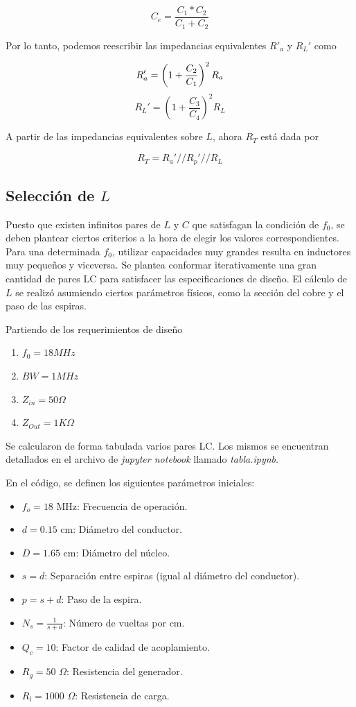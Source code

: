 $$
C_e = \frac{C_1*C_2}{C_1+C_2}
$$

Por lo tanto, podemos reescribir las impedancias equivalentes $R'_a$ y $R_L'$ como

$$
R_a' = \left( 1 + \frac{C_2}{C_1} \right)^2 R_a \\
$$
$$
R_L' = \left( 1 + \frac{C_3}{C_4} \right)^2 R_L
$$

A partir de las impedancias equivalentes sobre $L$, ahora $R_T$ está dada por

$$
R_T = R_a'//R_p'//R_L
$$

\subsection{Selección de $L$}

Puesto que existen infinitos pares de $L$ y $C$ que satisfagan la condición de $f_0$, se deben plantear ciertos criterios a la hora de elegir los valores correspondientes. Para una determinada $f_0$, utilizar capacidades muy grandes resulta en inductores muy pequeños y viceversa. Se plantea conformar iterativamente una gran cantidad de pares LC para satisfacer las especificaciones de diseño. El cálculo de $L$ se realizó asumiendo ciertos parámetros físicos, como la sección del cobre y el paso de las espiras.

Partiendo de los requerimientos de diseño

\begin{enumerate}
    \item $f_0 = 18 MHz$
    \item $BW = 1MHz$
    \item $Z_{in}=50\Omega$
    \item $Z_{Out} = 1K\Omega$
\end{enumerate}

Se calcularon de forma tabulada varios pares LC. Los mismos se encuentran detallados en el archivo de \textit{jupyter notebook} llamado \textit{tabla.ipynb}.

En el código, se definen los siguientes parámetros iniciales:
\begin{itemize}
    \item \( f_o = 18 \) MHz: Frecuencia de operación.
    \item \( d = 0.15 \) cm: Diámetro del conductor.
    \item \( D = 1.65 \) cm: Diámetro del núcleo.
    \item \( s = d \): Separación entre espiras (igual al diámetro del conductor).
    \item \( p = s + d \): Paso de la espira.
    \item \( N_s = \frac{1}{s + d} \): Número de vueltas por cm.
    \item \( Q_c = 10 \): Factor de calidad de acoplamiento.
    \item \( R_g = 50 \) \( \Omega \): Resistencia del generador.
    \item \( R_l = 1000 \) \( \Omega \): Resistencia de carga.
\end{itemize}

